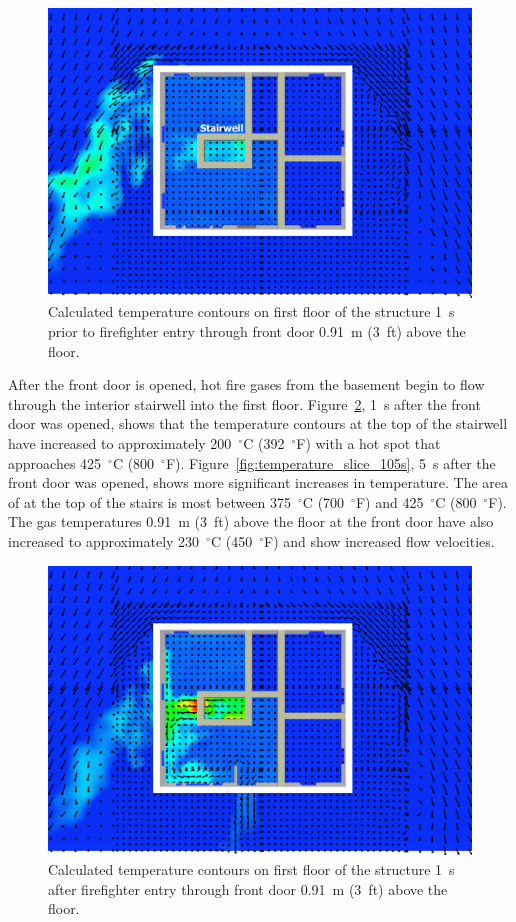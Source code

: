 \documentclass[12pt,oneside]{book}
\begin{document}
\begin{figure}[!ht]
\includegraphics[trim = 1in 1in 1in 1in, clip=true, width=.65\textwidth]{../Figures/temperature_slice_99s}


\caption[Calculated temperature on first floor 1~s before front door opened]
{Calculated temperature contours on first floor of the structure 1~s prior to firefighter entry through front door 0.91~m (3~ft) above the floor.}
\label{fig:temperature_slice_99s}
\end{figure}

After the front door is opened, hot fire gases from the basement begin to flow through the interior stairwell into the first floor. Figure~\ref{fig:temperature_slice_101s}, 1~s after the front door was opened, shows that the temperature contours at the top of the stairwell have increased to approximately 200~$^{\circ}$C (392~$^{\circ}$F) with a hot spot that approaches 425~$^{\circ}$C (800~$^{\circ}$F). Figure~\ref{fig:temperature_slice_105s}, 5~s after the front door was opened, shows more significant increases in temperature. The area of at the top of the stairs is most between 375~$^{\circ}$C (700~$^{\circ}$F) and 425~$^{\circ}$C (800~$^{\circ}$F). The gas temperatures 0.91~m (3~ft) above the floor at the front door have also increased to approximately 230~$^{\circ}$C (450~$^{\circ}$F) and show increased flow velocities.

\begin{figure}[!ht]
\includegraphics[trim = 1in 1in 1in 1in, clip=true, width=.65\textwidth]{../Figures/temperature_slice_101s}


\caption[Calculated temperature on first floor 1~s after front door opens]
{Calculated temperature contours on first floor of the structure 1~s after firefighter entry through front door 0.91~m (3~ft) above the floor.}
\label{fig:temperature_slice_101s}
\end{figure}
\end{document}
